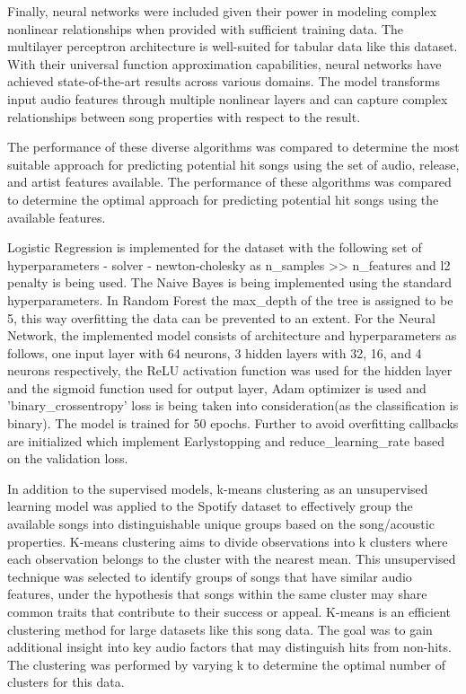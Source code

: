 \documentclass{article}
\begin{document}
Finally, neural networks were included given their power in modeling complex nonlinear relationships when provided with sufficient training data. The multilayer perceptron architecture is well-suited for tabular data like this dataset. With their universal function approximation capabilities, neural networks have achieved state-of-the-art results across various domains\cite{Hajela1992NeuralNI}\cite{Iannella2001ASN}.  The model transforms input audio features through multiple nonlinear layers and can capture complex relationships between song properties with respect to the result.

The performance of these diverse algorithms was compared to determine the most suitable approach for predicting potential hit songs using the set of audio, release, and artist features available. The performance of these algorithms was compared to determine the optimal approach for predicting potential hit songs using the available features.

Logistic Regression is implemented for the dataset with the following set of hyperparameters - solver - newton-cholesky as n\_samples >> n\_features and l2 penalty is being used. The Naive Bayes is being implemented using the standard hyperparameters. In Random Forest the max\_depth of the tree is assigned to be 5, this way overfitting the data can be prevented to an extent. For the Neural Network, the implemented model consists of architecture and hyperparameters as follows,  one input layer with 64 neurons, 3 hidden layers with 32, 16, and 4 neurons respectively, the ReLU activation function was used for the hidden layer and the sigmoid function used for output layer, Adam optimizer is used and 'binary\_crossentropy' loss is being taken into consideration(as the classification is binary). The model is trained for 50 epochs. Further to avoid overfitting callbacks are initialized which implement Earlystopping and reduce\_learning\_rate based on the validation loss.

In addition to the supervised models, k-means clustering as an unsupervised learning model was applied to the Spotify dataset to effectively group the available songs into distinguishable unique groups based on the song/acoustic properties. K-means clustering aims to divide observations into k clusters where each observation belongs to the cluster with the nearest mean. This unsupervised technique was selected to identify groups of songs that have similar audio features\cite{Wlfing2012UnsupervisedLO}, under the hypothesis that songs within the same cluster may share common traits that contribute to their success or appeal. K-means is an efficient clustering method for large datasets like this song data. The goal was to gain additional insight into key audio factors that may distinguish hits from non-hits. The clustering was performed by varying k to determine the optimal number of clusters for this data.
\end{document}
